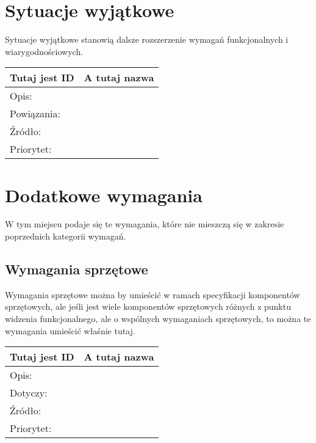 \documentclass[a4paper,10pt]{article}
\begin{document}
\section{Sytuacje wyjątkowe}

Sytuacje wyjątkowe stanowią dalsze rozszerzenie wymagań funkcjonalnych i wiarygodnościowych.

\begin{center}
\begin{tabular}{|l|l|} \hline

Tutaj jest ID & A tutaj nazwa \\ \hline
Opis: &  \\ \hline
Powiązania: &  \\ \hline
Źródło: &  \\ \hline
Priorytet: &  \\ \hline

\end{tabular}
\end{center}

\section{Dodatkowe wymagania}

W tym miejscu podaje się te wymagania, które nie mieszczą się w zakresie poprzednich kategorii wymagań.

\subsection{Wymagania sprzętowe}

Wymagania sprzętowe można by umieścić w ramach specyfikacji komponentów sprzętowych, ale jeśli jest wiele komponentów sprzętowych różnych z punktu widzenia funkcjonalnego, ale o wspólnych wymaganiach sprzętowych, to można te wymagania umieścić właśnie tutaj.

\begin{center}
\begin{tabular}{|l|l|} \hline

Tutaj jest ID & A tutaj nazwa \\ \hline
Opis: &  \\ \hline
Dotyczy: &  \\ \hline
Źródło: &  \\ \hline
Priorytet: &  \\ \hline

\end{tabular}
\end{center}
\end{document}
